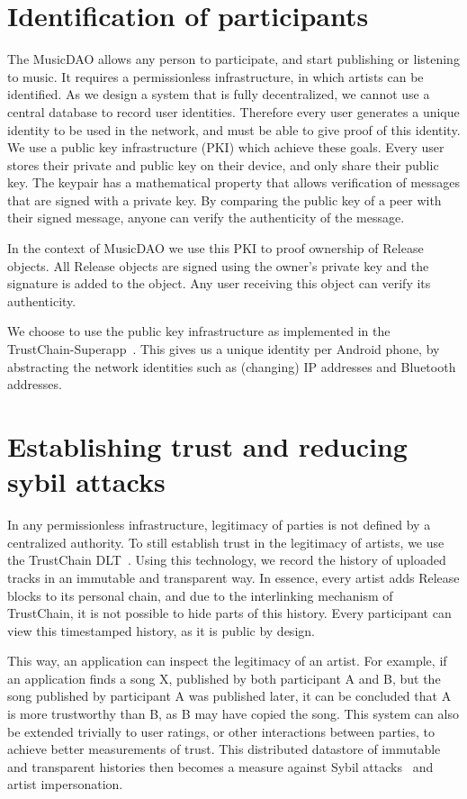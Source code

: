 \section{Identification of participants}
\label{sec:pki-design}
The MusicDAO allows any person to participate, and start publishing or listening to music. It requires a permissionless infrastructure, in which artists can be identified. As we design a system that is fully decentralized, we cannot use a central database to record user identities. Therefore every user generates a unique identity to be used in the network, and must be able to give proof of this identity. We use a public key infrastructure (PKI) which achieve these goals. Every user stores their private and public key on their device, and only share their public key. The keypair has a mathematical property that allows verification of messages that are signed with a private key. By comparing the public key of a peer with their signed message, anyone can verify the authenticity of the message.

In the context of MusicDAO we use this PKI to proof ownership of Release objects. All Release objects are signed using the owner's private key and the signature is added to the object. Any user receiving this object can verify its authenticity.

We choose to use the public key infrastructure as implemented in the TrustChain-Superapp~\citep{mattskala2020}. This gives us a unique identity per Android phone, by abstracting the network identities such as (changing) IP addresses and Bluetooth addresses. 

\section{Establishing trust and reducing sybil attacks}
In any permissionless infrastructure, legitimacy of parties is not defined by a centralized authority. To still establish trust in the legitimacy of artists, we use the TrustChain DLT~\citep{otte2017trustchain}. Using this technology, we record the history of uploaded tracks in an immutable and transparent way. In essence, every artist adds Release blocks to its personal chain, and due to the interlinking mechanism of TrustChain, it is not possible to hide parts of this history. Every participant can view this timestamped history, as it is public by design. 

This way, an application can inspect the legitimacy of an artist. For example, if an application finds a song X, published by both participant A and B, but the song published by participant A was published later, it can be concluded that A is more trustworthy than B, as B may have copied the song. This system can also be extended trivially to user ratings, or other interactions between parties, to achieve better measurements of trust. This distributed datastore of immutable and transparent histories then becomes a measure against Sybil attacks~\citep{douceur2002sybil} and artist impersonation.

